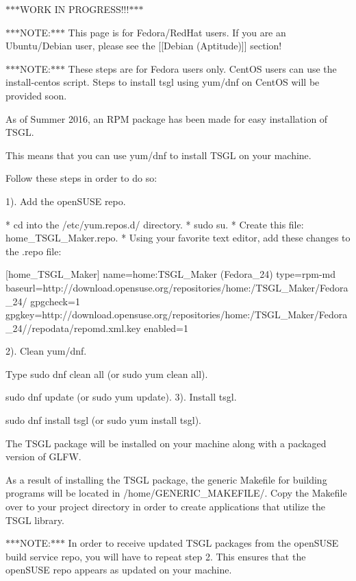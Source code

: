 $\ast$$\ast$$\ast$\-W\-O\-R\-K I\-N P\-R\-O\-G\-R\-E\-S\-S!!!$\ast$$\ast$$\ast$

$\ast$$\ast$$\ast$\-N\-O\-T\-E\-:$\ast$$\ast$$\ast$ This page is for Fedora/\-Red\-Hat users. If you are an Ubuntu/\-Debian user, please see the \mbox{[}\mbox{[}Debian (Aptitude)\mbox{]}\mbox{]} section!

$\ast$$\ast$$\ast$\-N\-O\-T\-E\-:$\ast$$\ast$$\ast$ These steps are for Fedora users only. Cent\-O\-S users can use the install-\/centos script. Steps to install tsgl using yum/dnf on Cent\-O\-S will be provided soon.

As of Summer 2016, an R\-P\-M package has been made for easy installation of T\-S\-G\-L.

This means that you can use yum/dnf to install T\-S\-G\-L on your machine.

Follow these steps in order to do so\-:

1). Add the open\-S\-U\-S\-E repo. \begin{DoxyVerb} * cd into the /etc/yum.repos.d/ directory.
 * sudo su.
 * Create this file: home_TSGL_Maker.repo.
 * Using your favorite text editor, add these changes to the .repo file:

    [home_TSGL_Maker]
    name=home:TSGL_Maker (Fedora_24)
    type=rpm-md
    baseurl=http://download.opensuse.org/repositories/home:/TSGL_Maker/Fedora_24/
    gpgcheck=1
    gpgkey=http://download.opensuse.org/repositories/home:/TSGL_Maker/Fedora_24//repodata/repomd.xml.key    
    enabled=1
\end{DoxyVerb}


2). Clean yum/dnf.
\begin{DoxyItemize}
\item Type sudo dnf clean all (or sudo yum clean all).
\item sudo dnf update (or sudo yum update). 3). Install tsgl.
\item sudo dnf install tsgl (or sudo yum install tsgl).
\end{DoxyItemize}

The T\-S\-G\-L package will be installed on your machine along with a packaged version of G\-L\-F\-W.

As a result of installing the T\-S\-G\-L package, the generic Makefile for building programs will be located in /home/\-G\-E\-N\-E\-R\-I\-C\-\_\-\-M\-A\-K\-E\-F\-I\-L\-E/. Copy the Makefile over to your project directory in order to create applications that utilize the T\-S\-G\-L library.

$\ast$$\ast$$\ast$\-N\-O\-T\-E\-:$\ast$$\ast$$\ast$ In order to receive updated T\-S\-G\-L packages from the open\-S\-U\-S\-E build service repo, you will have to repeat step 2. This ensures that the open\-S\-U\-S\-E repo appears as updated on your machine. 